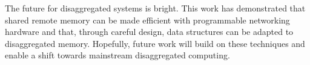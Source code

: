 \documentclass[12pt]{ucsddissertation}
\newcommand{\sword}{SwordBox}
\begin{document}

The future for disaggregated systems is bright. This work has demonstrated that shared remote memory
can be made efficient with programmable networking hardware and that, through careful design, data
structures can be adapted to disaggregated memory. Hopefully, future work will build on these
techniques and enable a shift towards mainstream disaggregated computing.







\end{document}
